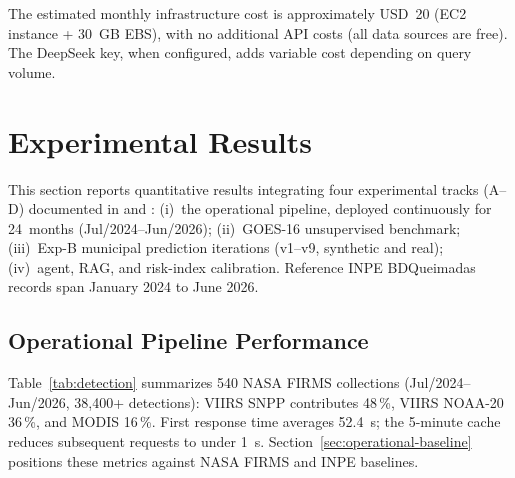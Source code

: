 \documentclass[preprint,12pt,times,numbers]{elsarticle}
\begin{document}
The estimated monthly infrastructure cost is approximately USD~20 (EC2 instance + 30~GB EBS), with no additional API costs (all data sources are free). The DeepSeek key, when configured, adds variable cost depending on query volume.

\section{Experimental Results}
\label{sec:results}

This section reports quantitative results integrating four experimental tracks (A--D) documented in  and : (i)~the operational pipeline, deployed continuously for 24~months (Jul/2024--Jun/2026); (ii)~GOES-16 unsupervised benchmark; (iii)~Exp-B municipal prediction iterations (v1--v9, synthetic and real); (iv)~agent, RAG, and risk-index calibration. Reference INPE BDQueimadas records span January 2024 to June 2026.



\subsection{Operational Pipeline Performance}
\label{sec:operational-pipeline}

Table~\ref{tab:detection} summarizes 540 NASA FIRMS collections (Jul/2024--Jun/2026, 38{,}400+ detections): VIIRS SNPP contributes 48\,\%, VIIRS NOAA-20 36\,\%, and MODIS 16\,\%. First response time averages 52.4~s; the 5-minute cache reduces subsequent requests to under 1~s. Section~\ref{sec:operational-baseline} positions these metrics against NASA FIRMS and INPE baselines.
\end{document}
